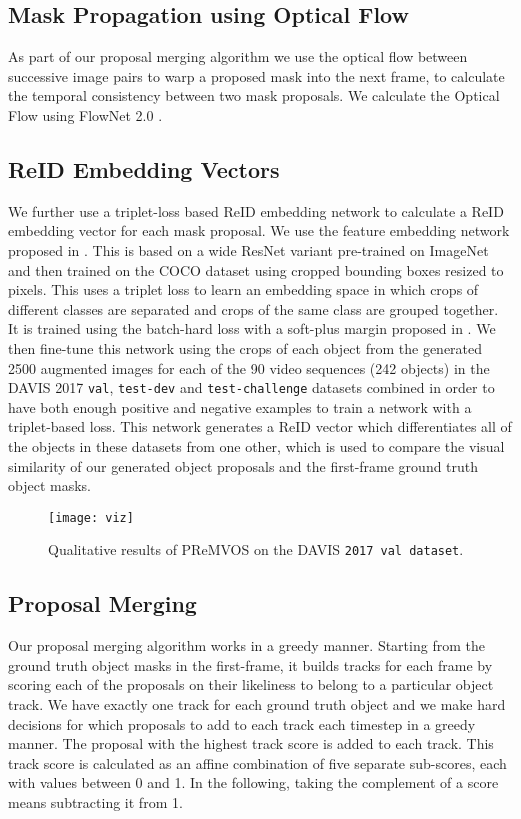 \documentclass[runningheads]{llncs}
\begin{document}
\subsection{Mask Propagation using Optical Flow}
As part of our proposal merging algorithm we use the optical flow between successive image pairs to warp a proposed mask into the next frame, to calculate the temporal consistency between two mask proposals. We calculate the Optical Flow using FlowNet 2.0 \cite{ilg2017flownet}.

\subsection{ReID Embedding Vectors}
We further use a triplet-loss based ReID embedding network to calculate a ReID embedding vector for each mask proposal. We use the feature embedding network proposed in \cite{ovsep2017large}.
This is based on a wide ResNet variant \cite{wu2016wider} pre-trained on ImageNet \cite{Deng09CVPR} and then trained on the COCO dataset \cite{lin2014microsoft} using cropped bounding boxes resized to  pixels. This uses a triplet loss to learn an embedding space in which crops of different classes are separated and crops of the same class are grouped together. It is trained using the batch-hard loss with a soft-plus margin proposed in \cite{HermansBeyer2017Arxiv}.
We then fine-tune this network using the crops of each object from the generated 2500 augmented images for each of the 90 video sequences (242 objects) in the DAVIS 2017 \texttt{val}, \texttt{test-dev} and \texttt{test-challenge} datasets combined in order to have both enough positive and negative examples to train a network with a triplet-based loss. This network generates a ReID vector which differentiates all of the objects in these datasets from one other, which is used to compare the visual similarity of our generated object proposals and the first-frame ground truth object masks.

\begin{figure}[t!]
  \centering
    \texttt{[image: viz]}
  \caption{Qualitative results of PReMVOS on the DAVIS \texttt{2017 val dataset}.}
  \label{fig:viz}
\end{figure}

\subsection{Proposal Merging}
Our proposal merging algorithm works in a greedy manner. Starting from the ground truth object masks in the first-frame, it builds tracks for each frame by scoring each of the proposals on their likeliness to belong to a particular object track. We have exactly one track for each ground truth object and we make hard decisions for which proposals to add to each track each timestep in a greedy manner. The proposal with the highest track score is added to each track. This track score is calculated as an affine combination of five separate sub-scores, each with values between 0 and 1. In the following, taking the complement of a score means subtracting it from 1.
\end{document}
